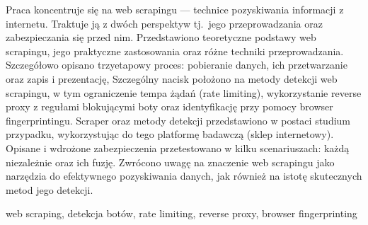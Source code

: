 \streszczenie
Praca koncentruje się na web scrapingu --- technice pozyskiwania informacji z internetu.
Traktuje ją z dwóch perspektyw tj.~jego przeprowadzania oraz zabezpieczania się przed nim.
Przedstawiono teoretyczne podstawy web scrapingu, jego praktyczne zastosowania oraz różne techniki przeprowadzania.
Szczegółowo opisano trzyetapowy proces: pobieranie danych, ich przetwarzanie oraz zapis i prezentację,
Szczególny nacisk położono na metody detekcji web scrapingu, w tym ograniczenie tempa żądań (rate limiting),
wykorzystanie reverse proxy z regułami blokującymi boty oraz identyfikację przy pomocy browser fingerprintingu.
Scraper oraz metody detekcji przedstawiono w postaci studium przypadku, wykorzystując do tego platformę badawczą (sklep internetowy).
Opisane i wdrożone zabezpieczenia przetestowano w kilku scenariuszach: każdą niezależnie oraz ich fuzję.
Zwrócono uwagę na znaczenie web scrapingu jako narzędzia do efektywnego pozyskiwania danych, jak również na istotę skutecznych metod jego detekcji.

\slowakluczowe web scraping, detekcja botów, rate limiting, reverse proxy, browser fingerprinting